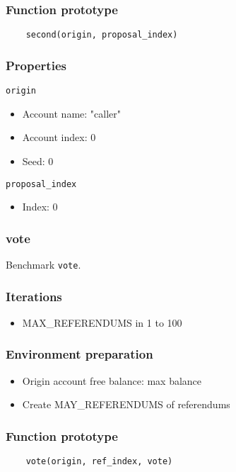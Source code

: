 \documentclass[11pt,a4paper]{article}
\begin{document}
\subsubsection*{Function prototype}
\begin{verbatim}
    second(origin, proposal_index)
\end{verbatim}

\subsubsection*{Properties}
\verb|origin|
\begin{itemize}
    \item Account name: "caller"
    \item Account index: 0 
    \item Seed: 0
\end{itemize}
\verb|proposal_index|
\begin{itemize}
    \item Index: 0
\end{itemize}

\subsubsection{vote}

Benchmark \verb|vote|.

\subsubsection*{Iterations}
\begin{itemize}
    \item MAX\_REFERENDUMS in 1 to 100
\end{itemize}

\subsubsection*{Environment preparation}
\begin{itemize}
    \item Origin account free balance: max balance
    \item Create MAY\_REFERENDUMS of referendums
\end{itemize}

\subsubsection*{Function prototype}
\begin{verbatim}
    vote(origin, ref_index, vote)
\end{verbatim}
\end{document}
